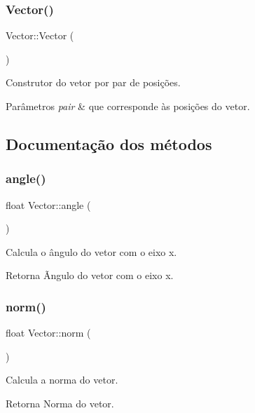 \subsubsection{\texorpdfstring{Vector()}{Vector()}\hspace{0.1cm}{\footnotesize\ttfamily [2/2]}}
{\footnotesize\ttfamily Vector\+::\+Vector (\begin{DoxyParamCaption}\item[{pair$<$ float, float $>$}]{ }\end{DoxyParamCaption})}

Construtor do vetor por par de posições. 
\begin{DoxyParams}{Parâmetros}
{\em pair} & que corresponde às posições do vetor. \\
\hline
\end{DoxyParams}


\subsection{Documentação dos métodos}
\mbox{\label{classVector_ac83edd3ce21c2eea555a360f64cf0acc}} 
\subsubsection{\texorpdfstring{angle()}{angle()}}
{\footnotesize\ttfamily float Vector\+::angle (\begin{DoxyParamCaption}{ }\end{DoxyParamCaption})}

Calcula o ângulo do vetor com o eixo x. \begin{DoxyReturn}{Retorna}
Ãngulo do vetor com o eixo x. 
\end{DoxyReturn}
\mbox{\label{classVector_a4d643a71ea7c87cb77ab7bdfb26b42ba}} 
\subsubsection{\texorpdfstring{norm()}{norm()}}
{\footnotesize\ttfamily float Vector\+::norm (\begin{DoxyParamCaption}{ }\end{DoxyParamCaption})}

Calcula a norma do vetor. \begin{DoxyReturn}{Retorna}
Norma do vetor. 
\end{DoxyReturn}
\mbox{\label{classVector_a7f187d9dc1da47c2d3754e8260a4c0e7}} 
